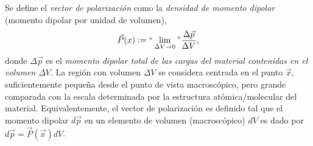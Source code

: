 Se define el \textit{vector de polarización} como la \textit{densidad de
momento dipolar} (momento dipolar por unidad de volumen),
\begin{equation}\label{defP}
\vec{P}(x):= ``\lim_{\Delta V\to 0}" \frac{\Delta\vec{p}}{\Delta V},
\end{equation}
donde $\Delta\vec{p}$ es el \textit{momento dipolar total de las cargas del material contenidas en el volumen} $\Delta V$. La región con volumen $\Delta V$ se considera centrada en el punto $\vec{x}$, suficientemente peque\~na desde el punto de vista macroscópico, pero grande comparada con la escala  determinada por la estructura atómica/molecular del material. Equivalentemente, el vector de polarización es definido tal que el momento dipolar $d\vec{p}$ en un elemento de volumen (macroscópico) $dV$ es dado por $d\vec{p}=\vec{P}(\vec{x})dV$.

